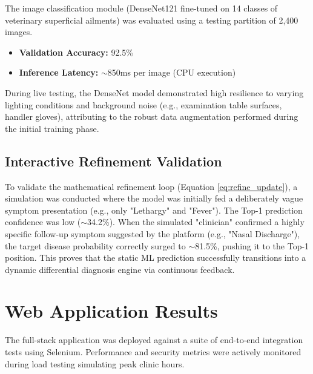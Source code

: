\documentclass[a4paper,12pt]{report}
\begin{document}
The image classification module (DenseNet121 fine-tuned on 14 classes of veterinary superficial ailments) was evaluated using a testing partition of 2,400 images.

\begin{itemize}
    \item \textbf{Validation Accuracy:} 92.5\%
    \item \textbf{Inference Latency:} $\sim$850ms per image (CPU execution)
\end{itemize}

During live testing, the DenseNet model demonstrated high resilience to varying lighting conditions and background noise (e.g., examination table surfaces, handler gloves), attributing to the robust data augmentation performed during the initial training phase.

\subsection{Interactive Refinement Validation}

To validate the mathematical refinement loop (Equation \ref{eq:refine_update}), a simulation was conducted where the model was initially fed a deliberately vague symptom presentation (e.g., only "Lethargy" and "Fever"). The Top-1 prediction confidence was low ($\sim$34.2\%). When the simulated "clinician" confirmed a highly specific follow-up symptom suggested by the platform (e.g., "Nasal Discharge"), the target disease probability correctly surged to $\sim$81.5\%, pushing it to the Top-1 position. This proves that the static ML prediction successfully transitions into a dynamic differential diagnosis engine via continuous feedback.

\section{Web Application Results}

The full-stack application was deployed against a suite of end-to-end integration tests using Selenium. Performance and security metrics were actively monitored during load testing simulating peak clinic hours.
\end{document}
